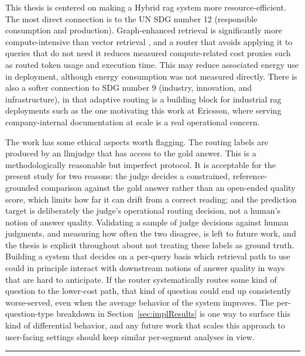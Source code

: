 \documentclass[english, bibtex]{kththesis}               %
\numberwithin{listing}{chapter}
\providecommand{\DIFdeltex}[1]{{\protect\color{red} \scriptsize #1}} %
\providecommand{\DIFdelend}{} %
\providecommand{\DIFdel}[1]{\texorpdfstring{\DIFdeltex{#1}}{}} %
\begin{document}
\DIFdel{This thesis is centered on making a Hybrid \gls{rag} system more resource-efficient. The most direct connection is to the \gls{UN} \gls{SDG} number 12 (responsible consumption and production). Graph-enhanced retrieval is significantly more compute-intensive than vector retrieval \cite{lightrag2024,microsoft2024graphragcosts}, and a router that avoids applying it to queries that do not need it reduces measured compute-related cost proxies such as routed token usage and execution time. This may reduce associated energy use in deployment, although energy consumption was not measured directly. There is also a softer connection to \gls{SDG} number 9 (industry, innovation, and infrastructure), in that adaptive routing is a building block for industrial \gls{rag} deployments such as the one motivating this work at Ericsson, where serving company-internal documentation at scale is a real operational concern.
}%

\DIFdel{The work has some ethical aspects worth flagging. The routing labels are produced by an \gls{llmjudge} that has access to the gold answer. This is a methodologically reasonable but imperfect protocol. It is acceptable for the present study for two reasons: the judge decides a constrained, reference-grounded comparison against the gold answer rather than an open-ended quality score, which limits how far it can drift from a correct reading; and the prediction target is deliberately the judge's operational routing decision, not a human's notion of answer quality. Validating a sample of judge decisions against human judgments, and measuring how often the two disagree, is left to future work, and the thesis is explicit throughout about not treating these labels as ground truth. Building a system that decides on a per-query basis which retrieval path to use could in principle interact with downstream notions of answer quality in ways that are hard to anticipate. If the router systematically routes some kind of question to the lower-cost path, that kind of question could end up consistently worse-served, even when the average behavior of the system improves. The per-question-type breakdown in Section~\ref{sec:implResults} is one way to surface this kind of differential behavior, and any future work that scales this approach to user-facing settings should keep similar per-segment analyses in view.
}%

\DIFdelend \noindent\rule{\textwidth}{0.4mm}

\cleardoublepage
\renewcommand{\bibname}{References}
\end{document}
